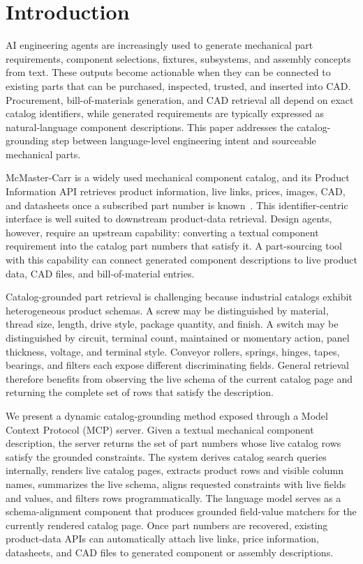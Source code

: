\documentclass[colorlinks,upint,subscriptcorrection,varvw,hyphenate,balance,nofoot]{asmeconf}
\newcommand{\mcp}{MCP}
\begin{document}
\section{Introduction}

AI engineering agents are increasingly used to generate mechanical part requirements, component selections, fixtures, subsystems, and assembly concepts from text. These outputs become actionable when they can be connected to existing parts that can be purchased, inspected, trusted, and inserted into CAD. Procurement, bill-of-materials generation, and CAD retrieval all depend on exact catalog identifiers, while generated requirements are typically expressed as natural-language component descriptions. This paper addresses the catalog-grounding step between language-level engineering intent and sourceable mechanical parts.

McMaster-Carr is a widely used mechanical component catalog, and its Product Information API retrieves product information, live links, prices, images, CAD, and datasheets once a subscribed part number is known~\cite{mcmasterapi}. This identifier-centric interface is well suited to downstream product-data retrieval. Design agents, however, require an upstream capability: converting a textual component requirement into the catalog part numbers that satisfy it. A part-sourcing tool with this capability can connect generated component descriptions to live product data, CAD files, and bill-of-material entries.

Catalog-grounded part retrieval is challenging because industrial catalogs exhibit heterogeneous product schemas. A screw may be distinguished by material, thread size, length, drive style, package quantity, and finish. A switch may be distinguished by circuit, terminal count, maintained or momentary action, panel thickness, voltage, and terminal style. Conveyor rollers, springs, hinges, tapes, bearings, and filters each expose different discriminating fields. General retrieval therefore benefits from observing the live schema of the current catalog page and returning the complete set of rows that satisfy the description.

We present a dynamic catalog-grounding method exposed through a Model Context Protocol (\mcp{}) server. Given a textual mechanical component description, the server returns the set of part numbers whose live catalog rows satisfy the grounded constraints. The system derives catalog search queries internally, renders live catalog pages, extracts product rows and visible column names, summarizes the live schema, aligns requested constraints with live fields and values, and filters rows programmatically. The language model serves as a schema-alignment component that produces grounded field-value matchers for the currently rendered catalog page. Once part numbers are recovered, existing product-data APIs can automatically attach live links, price information, datasheets, and CAD files to generated component or assembly descriptions.
\end{document}
